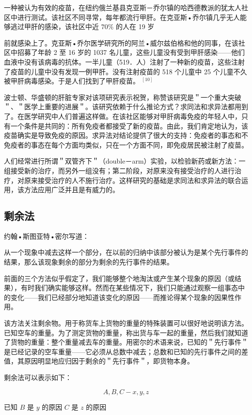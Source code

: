 一种被认为有效的疫苗，在纽约俄兰基县克亚斯－乔尔镇的哈西德教派的犹太人社区中进行测试。该社区不同寻常，每年都流行甲肝。在克亚斯•乔尔镇几乎无人能够逃过甲肝的感染，该社区中近 $70 \%$ 的人在 19 岁

前就感染上了。克亚斯•乔尔医学研究所的阿兰•威尔兹伯格和他的同事，在该社区中招募了年龄 2 至 16 岁的 1037 名儿童，这些儿童没有受到甲肝感染——他们血液中没有该病毒的抗体。一半儿童（519．人）注射了一种新的疫苗，这些注射了疫苗的儿童中没有发现一例甲肝。没有注射疫苗的 518 个儿童中 25 个儿童不久被甲肝病毒感染。于是人们找到了甲肝疫苗。 ${ }^{[10]}$

波士顿、华盛顿的肝脏专家对该项研究表示祝贺，称赞该研究是＂一个重大突破＂、＂医学上重要的进展＂。该研究依赖于什么推论方式？求同法和求异法都用到了。在医学研究中人们普遍这样做。在该社区能够对甲肝病毒免疫的年轻人中，只有一个条件是共同的：所有免疫者都接受了新的疫苗。由此，我们肯定地认为，该疫苗确实是导致免疫的原因。求异法对结论提供了很大的支持：免疫者的事态和不免疫者的事态在每个方面均类似，只在一个方面不同，即免疫居民被注射了疫苗。

人们经常进行所谓＂双管齐下＂（double－arm）实验，以检验新药或新方法：一组接受新的治疗，而另外一组没有；第二阶段，对原来没有接受治疗的人进行治疗，对原来接受治疗的人不施行治疗。这样研究的基础是求同法和求异法的联合运用，该方法应用广泛并且是有威力的。

\subsection{剩余法}
约翰•斯图亚特•密尔写道：

从一个现象中减去这样一个部分，在以前的归纳中该部分被认为是某个先行事件的结果，那么该现象剩余的部分为剩余的先行事件的结果。

前面的三个方法似乎假定了，我们能够整个地淘汰或产生某个现象的原因（或结果），有时我们确实能够这样。然而在某些情况下，我们只能通过观察一组事态中的变化——我们已经部分地知道该变化的原因——而推论得某个现象的因果性作用。

该方法关注剩余物。用于称货车上货物的重量的特殊装置可以很好地说明该方法。已知空车的重量。为了测定货物的重量，称出货与车一起的重量，然后我们就知道了货物的重量：整个重量减去车的重量。用密尔的术语来说，已知的＂先行事件＂是已经记录的空车重量——它必须从总数中减去；总数和已知的先行事件之间的差值，其原因明显地应归因于剩余的＂先行事件＂，即货物本身。

剩余法可以表示如下：

$$
A, B, C-x, y, z
$$

已知 $B$ 是 $y$ 的原因 $C$ 是 $z$ 的原因

